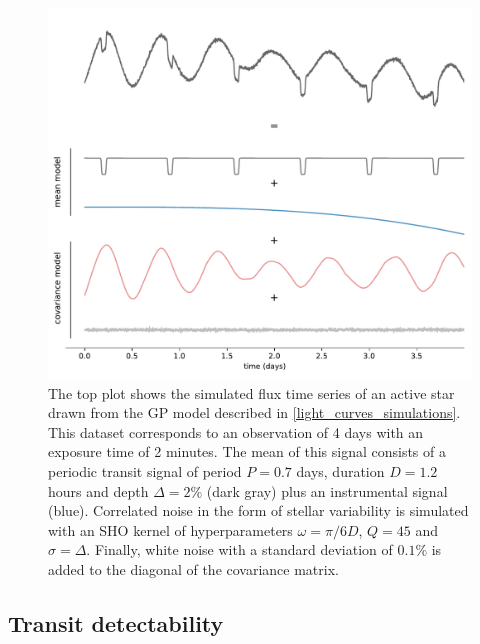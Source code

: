 \documentclass[modern,linenumbers]{aastex631}
\begin{document}
\begin{figure}[H]
    \begin{centering}
        \includegraphics[width=\linewidth]{../workflows/principle/figures/principle_dataset_decomposed.pdf}
        \caption{The top plot shows the simulated flux time series of an active star drawn from the GP model described in \autoref{light_curves_simulations}. This dataset corresponds to an observation of 4 days with an exposure time of 2 minutes. The mean of this signal consists of a periodic transit signal of period $P=0.7$ days, duration $D=1.2$ hours and depth $\Delta=2\%$ (dark gray) plus an instrumental signal (blue). Correlated noise in the form of stellar variability is simulated with an SHO kernel of hyperparameters $\omega = \pi / 6 D$, $Q=45$ and $\sigma = \Delta$. Finally, white noise with a standard deviation of $0.1\%$ is added to the diagonal of the covariance matrix.}
        \label{fig:app_principle_dataset}
    \end{centering}
\end{figure}
\subsection{Transit detectability}\label{transit_detectability}
\end{document}
